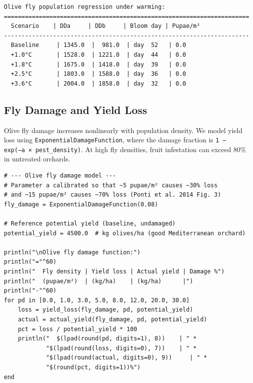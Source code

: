 \begin{verbatim}
Olive fly population regression under warming:
======================================================================
  Scenario    | DDa     | DDb     | Bloom day | Pupae/m²
----------------------------------------------------------------------
  Baseline     | 1345.0  |  981.0  | day  52   | 0.0
  +1.0°C       | 1528.0  | 1221.0  | day  44   | 0.0
  +1.8°C       | 1675.0  | 1418.0  | day  39   | 0.0
  +2.5°C       | 1803.0  | 1588.0  | day  36   | 0.0
  +3.6°C       | 2004.0  | 1858.0  | day  32   | 0.0
\end{verbatim}



\subsection{Fly Damage and Yield Loss}



\label{17586623639928842702}{}


Olive fly damage increases nonlinearly with population density. We model yield loss using \texttt{ExponentialDamageFunction}, where the damage fraction is \texttt{1 − exp(−a × pest\_density)}. At high fly densities, fruit infestation can exceed 80\% in untreated orchards.




\begin{verbatim}
# --- Olive fly damage model ---
# Parameter a calibrated so that ~5 pupae/m² causes ~30% loss
# and ~15 pupae/m² causes ~70% loss (Ponti et al. 2014 Fig. 3)
fly_damage = ExponentialDamageFunction(0.08)

# Reference potential yield (baseline, undamaged)
potential_yield = 4500.0  # kg olives/ha (good Mediterranean orchard)

println("\nOlive fly damage function:")
println("="^60)
println("  Fly density | Yield loss | Actual yield | Damage %")
println("  (pupae/m²)  | (kg/ha)    | (kg/ha)      |")
println("-"^60)
for pd in [0.0, 1.0, 3.0, 5.0, 8.0, 12.0, 20.0, 30.0]
    loss = yield_loss(fly_damage, pd, potential_yield)
    actual = actual_yield(fly_damage, pd, potential_yield)
    pct = loss / potential_yield * 100
    println("  $(lpad(round(pd, digits=1), 8))    | " *
            "$(lpad(round(loss, digits=0), 7))    | " *
            "$(lpad(round(actual, digits=0), 9))     | " *
            "$(round(pct, digits=1))%")
end
\end{verbatim}




